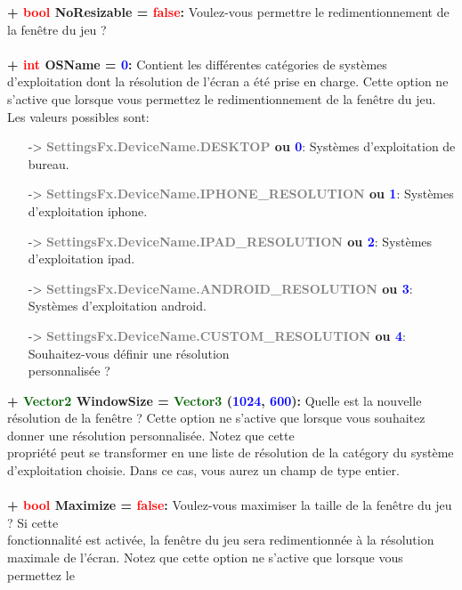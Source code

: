 \documentclass[a4paper, 11pt]{article}
\begin{document}
	\textbf{+ \textcolor{red}{bool} NoResizable = \textcolor{red}{false}:} Voulez-vous permettre le
	redimentionnement de la fenêtre du jeu ?\\\\
	\textbf{+ \textcolor{red}{int} OSName = \textcolor{blue}{0}:} Contient les différentes catégories de 
	systèmes d'exploitation dont la résolution de l'écran a été prise en charge. Cette option ne s'active 
	que lorsque vous permettez le redimentionnement de la fenêtre du jeu. Les valeurs possibles sont:
	\begin{itemize}
		\item [-> \textbf{\textcolor{gray}{SettingsFx.DeviceName.DESKTOP} ou \textcolor{blue}{0}}:] Systèmes 
		d'exploitation de bureau.
		\item [-> \textbf{\textcolor{gray}{SettingsFx.DeviceName.IPHONE\_RESOLUTION} ou \textcolor{blue}
		{1}}:] Systèmes d'exploitation iphone.
		\item [-> \textbf{\textcolor{gray}{SettingsFx.DeviceName.IPAD\_RESOLUTION} ou \textcolor{blue}{2}}:] 
		Systèmes d'exploitation ipad.
		\item [-> \textbf{\textcolor{gray}{SettingsFx.DeviceName.ANDROID\_RESOLUTION} ou \textcolor{blue}
		{3}}:] Systèmes d'exploitation android.
		\item [-> \textbf{\textcolor{gray}{SettingsFx.DeviceName.CUSTOM\_RESOLUTION} ou \textcolor{blue}
		{4}}:] Souhaitez-vous définir une résolution \\personnalisée ?\\
	\end{itemize}
	\newpage \textbf{+ \textcolor{darkgreen}{Vector2} \hypertarget{winsize}{WindowSize} =
	\textcolor{darkgreen}{Vector3} (\textcolor{blue}{1024}, \textcolor{blue}{600}):} Quelle est la nouvelle
	résolution de la fenêtre ? Cette option ne s'active que lorsque vous souhaitez donner une résolution
	personnalisée. Notez que cette \\propriété peut se transformer en une liste de résolution de la catégory 
	du système d'exploitation choisie. Dans ce cas, vous aurez un champ de type entier.\\\\
	\textbf{+ \textcolor{red}{bool} Maximize = \textcolor{red}{false}:} Voulez-vous maximiser la taille de 
	la fenêtre du jeu ? Si cette \\fonctionnalité est activée, la fenêtre du jeu sera redimentionnée à la 
	résolution maximale de l'écran. Notez que cette option ne s'active que lorsque vous permettez le
\end{document}
